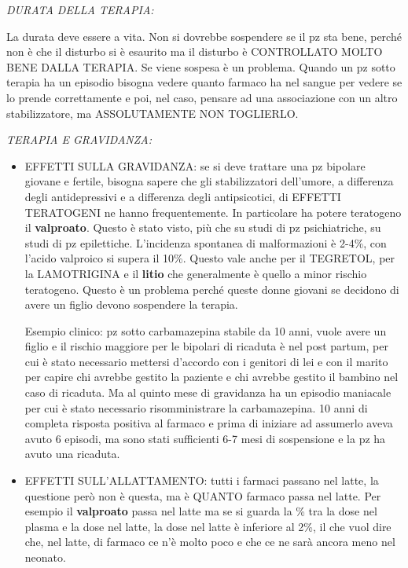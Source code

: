 \begin{itemize}
\emph{DURATA DELLA TERAPIA:}

La durata deve essere a vita. Non si dovrebbe sospendere se il pz sta
bene, perché non è che il disturbo si è esaurito ma il disturbo è
CONTROLLATO MOLTO BENE DALLA TERAPIA. Se viene sospesa è un problema.
Quando un pz sotto terapia ha un episodio bisogna vedere quanto farmaco
ha nel sangue per vedere se lo prende correttamente e poi, nel caso,
pensare ad una associazione con un altro stabilizzatore, ma
ASSOLUTAMENTE NON TOGLIERLO.

\emph{TERAPIA E GRAVIDANZA:}

\begin{itemize}
\item
  EFFETTI SULLA GRAVIDANZA: se si deve trattare una pz bipolare giovane
  e fertile, bisogna sapere che gli stabilizzatori dell'umore, a
  differenza degli antidepressivi e a differenza degli antipsicotici, di
  EFFETTI TERATOGENI ne hanno frequentemente. In particolare ha potere
  teratogeno il \textbf{valproato}. Questo è stato visto, più che su
  studi di pz psichiatriche, su studi di pz epilettiche. L'incidenza
  spontanea di malformazioni è 2-4\%, con l'acido valproico si supera il
  10\%. Questo vale anche per il TEGRETOL, per la LAMOTRIGINA e il
  \textbf{litio} che generalmente è quello a minor rischio teratogeno.
  Questo è un problema perché queste donne giovani se decidono di avere
  un figlio devono sospendere la terapia.

  Esempio clinico: pz sotto carbamazepina stabile da 10 anni, vuole
  avere un figlio e il rischio maggiore per le bipolari di ricaduta è
  nel post partum, per cui è stato necessario mettersi d'accordo con i
  genitori di lei e con il marito per capire chi avrebbe gestito la
  paziente e chi avrebbe gestito il bambino nel caso di ricaduta. Ma al
  quinto mese di gravidanza ha un episodio maniacale per cui è stato
  necessario risomministrare la carbamazepina. 10 anni di completa
  risposta positiva al farmaco e prima di iniziare ad assumerlo aveva
  avuto 6 episodi, ma sono stati sufficienti 6-7 mesi di sospensione e
  la pz ha avuto una ricaduta.
\item
  EFFETTI SULL'ALLATTAMENTO: tutti i farmaci passano nel latte, la
  questione però non è questa, ma è QUANTO farmaco passa nel latte. Per
  esempio il \textbf{valproato} passa nel latte ma se si guarda la \%
  tra la dose nel plasma e la dose nel latte, la dose nel latte è
  inferiore al 2\%, il che vuol dire che, nel latte, di farmaco ce n'è
  molto poco e che ce ne sarà ancora meno nel neonato.


\end{itemize}
\end{itemize}

